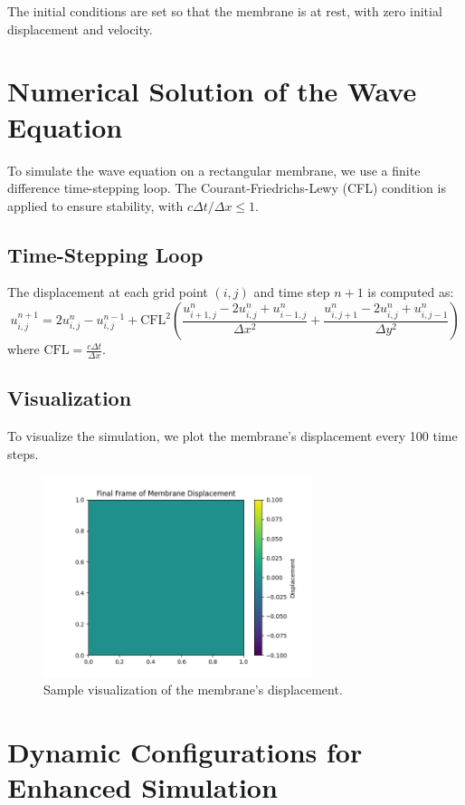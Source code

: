 \documentclass{article}
\begin{document}
The initial conditions are set so that the membrane is at rest, with zero initial displacement and velocity.

\section{Numerical Solution of the Wave Equation}

To simulate the wave equation on a rectangular membrane, we use a finite difference time-stepping loop. The Courant-Friedrichs-Lewy (CFL) condition is applied to ensure stability, with $c \Delta t / \Delta x \leq 1$.

\subsection{Time-Stepping Loop}
The displacement at each grid point $(i, j)$ and time step $n+1$ is computed as:
\[
u_{i, j}^{n+1} = 2u_{i, j}^n - u_{i, j}^{n-1} + \text{CFL}^2 \left( \frac{u_{i+1, j}^n - 2u_{i, j}^n + u_{i-1, j}^n}{\Delta x^2} + \frac{u_{i, j+1}^n - 2u_{i, j}^n + u_{i, j-1}^n}{\Delta y^2} \right)
\]
where $\text{CFL} = \frac{c \Delta t}{\Delta x}$.

\subsection{Visualization}
To visualize the simulation, we plot the membrane's displacement every 100 time steps.

\begin{figure}[h!]
\centering
\includegraphics[width=0.7\textwidth]{simulation.png}
\caption{Sample visualization of the membrane's displacement.}
\end{figure}

\section{Dynamic Configurations for Enhanced Simulation}
\end{document}
